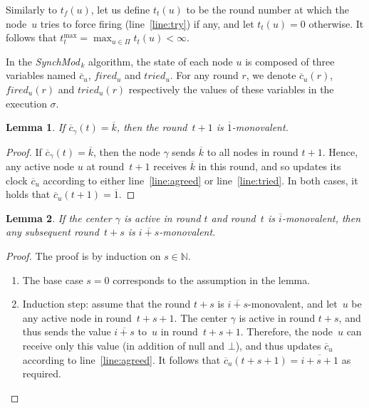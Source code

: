 \documentclass{article}
\newtheorem{lemma}{Lemma}[section]
\newcommand{\cent}{\gamma}
\newcommand{\IN}{\mathds{N}}
\newcommand{\tf}{t_{f}}
\newcommand{\try}{t_{t}}
\newcommand{\SM}{{\em SynchMod}$_{\,k}$ }
\begin{document}
Similarly to $\tf (u)$, let us define $\try (u)$ to be  the round number at which the node~$u$ tries to force firing
	(line~\ref{line:try}) if any, and let $\try (u)= 0$ otherwise.
It follows that $\try^{\max} =  \max_{u \in \Pi}  \try(u) < \infty$.

In the \SM algorithm, the state of each node $u$ is composed of three variables named $\overline{c}_u$, $fired_u$ and $tried_u$.
For any round $r$, we denote $\overline{c}_u(r)$, $fired_u(r)$ and $tried_u(r)$ respectively the values of these variables in the execution $\sigma$.

\begin{lemma}\label{lem:k_mono}
If $\overline{c}_\cent(t) = \overline{k} $, then the round~$t +1$  is $\overline{1}$-monovalent.
\end{lemma}

\begin{proof}
If $\overline{c}_\cent(t) = \overline{k} $, then the node $\cent$ sends $\overline{k}$ to all nodes in round $t+1$.
Hence, any active node $u$ at round~$t+1$ receives $\overline{k}$ in this round,
	and so updates its clock $\overline{c}_u$ according to either line~\ref{line:agreed} or line~\ref{line:tried}.
In both cases, it holds that $\overline{c}_u (t+1) =\overline{1}$.
\end{proof}

\begin{lemma}\label{lem:mono_mono}
	If the center $\cent$ is active in round $t$  and round~$t$ is $\overline{i}$-monovalent, 
	then any subsequent round~$ t + s$ is $\overline{i+ s}$-monovalent.
\end{lemma}

\begin{proof}
The proof is by induction on $s \in \IN$.
\begin{enumerate}
		\item The base case $s=0$ corresponds to the assumption in the lemma.
		\item Induction step:  assume that the round $t+s$ is $\overline{i+s}$-monovalent,
			 and let~$u$ be  any active node in round~$t+s+1$.
			The center $\cent$ is active in round $t +s$, and thus sends the value $\overline{i+s}$ to~$u$
				in round~$ t+s+1$.
			Therefore, the node~$u$ can receive only this value (in addition of null and $\bot$), and thus updates
				$\overline{c}_u$ according to line~\ref{line:agreed}. 
			It follows that $ \overline{c}_u(t+s+1) = \overline{i+s +1}$ as required.
\end{enumerate}
\end{proof}
\end{document}
